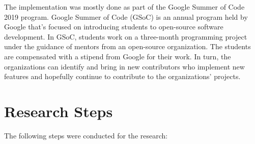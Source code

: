 The  implementation was mostly done as part of the Google
Summer of Code 2019 program. Google Summer of Code (GSoC) is an annual program
held by Google that's focused on introducing students to open-source software
development. In GSoC, students work on a three-month programming project under
the guidance of mentors from an open-source organization. The students are
compensated with a stipend from Google for their work. In turn, the
organizations can identify and bring in new contributors who implement new
features and hopefully continue to contribute to the organizations' projects.

\section{Research Steps}

The following steps were conducted for the research:

